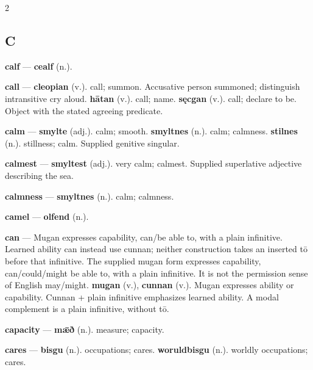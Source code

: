 \begin{multicols}{2}
\subsection*{C}
\textbf{calf} — \textbf{cealf} (n.).\par
\textbf{call} — \textbf{cleopian} (v.). call; summon. Accusative person summoned; distinguish intransitive cry aloud. \textbf{hātan} (v.). call; name. \textbf{sęcgan} (v.). call; declare to be. Object with the stated agreeing predicate.\par
\textbf{calm} — \textbf{smylte} (adj.). calm; smooth. \textbf{smyltnes} (n.). calm; calmness. \textbf{stilnes} (n.). stillness; calm. Supplied genitive singular.\par
\textbf{calmest} — \textbf{smyltest} (adj.). very calm; calmest. Supplied superlative adjective describing the sea.\par
\textbf{calmness} — \textbf{smyltnes} (n.). calm; calmness.\par
\textbf{camel} — \textbf{olfend} (n.).\par
\textbf{can} — Mugan expresses capability, can/be able to, with a plain infinitive. Learned ability can instead use cunnan; neither construction takes an inserted tō before that infinitive. The supplied mugan form expresses capability, can/could/might be able to, with a plain infinitive. It is not the permission sense of English may/might. \textbf{mugan} (v.), \textbf{cunnan} (v.). Mugan expresses ability or capability. Cunnan + plain infinitive emphasizes learned ability. A modal complement is a plain infinitive, without tō.\par
\textbf{capacity} — \textbf{mǣð} (n.). measure; capacity.\par
\textbf{cares} — \textbf{bisgu} (n.). occupations; cares. \textbf{woruldbisgu} (n.). worldly occupations; cares.\par

\end{multicols}
